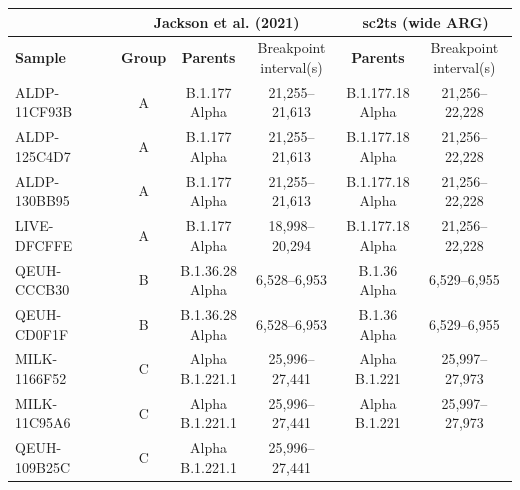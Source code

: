 \documentclass{article}
\begin{document}
\begin{table} \centering
\begin{tabular}{l|c|c|c|c|c} \hline
\multicolumn{1}{c}{} & \multicolumn{3}{c}{\textbf{Jackson et al. (2021)}} &
\multicolumn{2}{c}{\textbf{sc2ts (wide ARG)}} \\ \hline
\textbf{Sample} &
\textbf{Group} & \textbf{Parents} & \thead{Breakpoint \\
interval(s)} &
\textbf{Parents} & \thead{Breakpoint \\ interval(s)} \\
\hline ALDP-11CF93B & A
    & \thead{B.1.177 \\ Alpha} & 21,255–21,613 & \thead{B.1.177.18 \\ Alpha} &
21,256–22,228 \\
    ALDP-125C4D7 & A & \thead{B.1.177 \\ Alpha} & 21,255–21,613 &
    \thead{B.1.177.18 \\ Alpha} & 21,256–22,228 \\
ALDP-130BB95 & A & \thead{B.1.177 \\ Alpha} & 21,255–21,613 &
    \thead{B.1.177.18 \\ Alpha} & 21,256–22,228 \\
LIVE-DFCFFE & A & \thead{B.1.177 \\ Alpha} & 18,998–20,294 &
    \thead{B.1.177.18 \\ Alpha} & 21,256–22,228 \\
QEUH-CCCB30 & B & \thead{B.1.36.28 \\ Alpha} & 6,528–6,953 &
    \thead{B.1.36 \\ Alpha} & 6,529–6,955 \\
QEUH-CD0F1F & B & \thead{B.1.36.28 \\ Alpha} & 6,528–6,953 &
    \thead{B.1.36 \\ Alpha} & 6,529–6,955 \\
MILK-1166F52 & C & \thead{Alpha \\ B.1.221.1} & 25,996–27,441 &
    \thead{Alpha \\ B.1.221} & 25,997–27,973 \\
MILK-11C95A6 & C & \thead{Alpha \\ B.1.221.1} & 25,996–27,441 &
    \thead{Alpha \\ B.1.221} & 25,997–27,973 \\
QEUH-109B25C & C & \thead{Alpha \\ B.1.221.1} & 25,996–27,441 &

\end{tabular}
\end{table}
\end{document}
